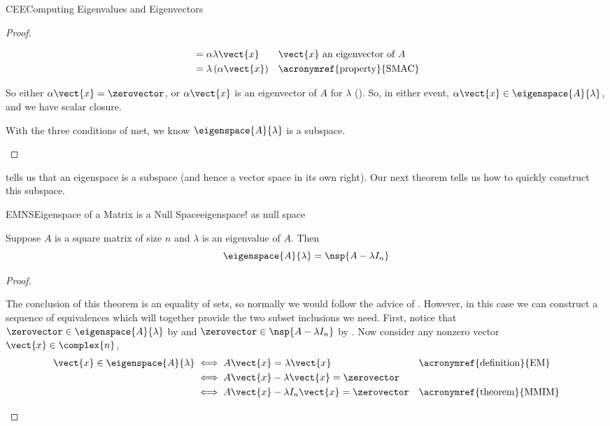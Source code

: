 \begin{subsect}{CEE}{Computing Eigenvalues and Eigenvectors}
\begin{proof}
\begin{para}
\begin{align*}
&=\alpha\lambda\vect{x}&&\text{$\vect{x}$ an eigenvector of $A$}\\
&=\lambda\left(\alpha\vect{x}\right)&&\text{\acronymref{property}{SMAC}}
\end{align*}\end{para}
%
\begin{para}So either $\alpha\vect{x}=\zerovector$, or $\alpha\vect{x}$ is an eigenvector of $A$ for $\lambda$ ().  So, in either event,  $\alpha\vect{x}\in\eigenspace{A}{\lambda}$, and we have scalar closure.\end{para}
%
\begin{para}With the three conditions of  met, we know $\eigenspace{A}{\lambda}$ is a subspace.\end{para}
%
\end{proof}
%
\begin{para} tells us that an eigenspace is a subspace (and hence a vector space in its own right).  Our next theorem tells us how to quickly construct this subspace.\end{para}
%
\begin{theorem}{EMNS}{Eigenspace of a Matrix is a Null Space}{eigenspace! as null space}
\begin{para}Suppose  $A$ is a square matrix of size $n$ and $\lambda$ is an eigenvalue of $A$.  Then
%
\begin{equation*}
\eigenspace{A}{\lambda}=\nsp{A-\lambda I_n}
\end{equation*}
\end{para}
%
\end{theorem}
%
\begin{proof}
\begin{para}The conclusion of this theorem is an equality of sets, so normally we would follow the advice of .  However, in this case we can construct a sequence of equivalences which will together provide the two subset inclusions we need.  First, notice that $\zerovector\in\eigenspace{A}{\lambda}$ by  and $\zerovector\in\nsp{A-\lambda I_n}$ by .  Now consider any nonzero vector $\vect{x}\in\complex{n}$,
%
\begin{align*}
\vect{x}\in\eigenspace{A}{\lambda}&\iff A\vect{x}=\lambda\vect{x}&&\text{\acronymref{definition}{EM}}\\
&\iff A\vect{x}-\lambda\vect{x}=\zerovector\\
&\iff A\vect{x}-\lambda I_n\vect{x}=\zerovector&&\text{\acronymref{theorem}{MMIM}}\\

\end{align*}
\end{para}
\end{proof}
\end{subsect}

